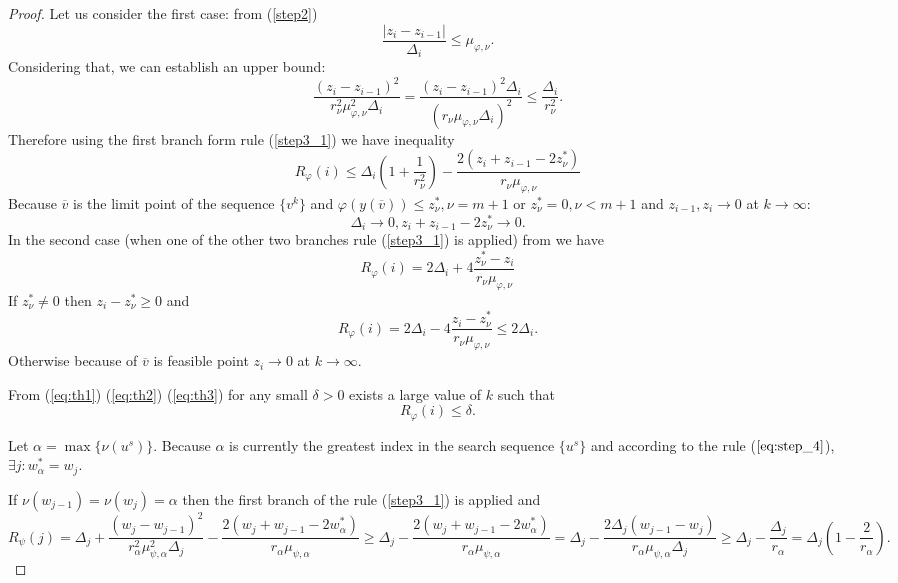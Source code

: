 \documentclass[runningheads]{llncs}
\begin{document}
\begin{proof}
  Let us consider the first case: from (\ref{step2})
  \begin{displaymath}
    \frac{|z_i-z_{i-1}|}{\Delta_i} \leqslant \mu_{\varphi,\nu}.
  \end{displaymath}
  Considering that, we can establish an upper bound:
  \begin{displaymath}
    \frac{(z_i-z_{i-1})^2}{r_\nu^2\mu_{\varphi,\nu}^2\Delta_i}=\frac{(z_i-z_{i-1})^2\Delta_i}{(r_\nu\mu_{\varphi,\nu}\Delta_i)^2}
    \leqslant \frac{\Delta_i}{r_\nu^2}.
  \end{displaymath}
  Therefore using the first branch form rule (\ref{step3_1}) we have inequality
  \begin{equation}
    \label{eq:th1}
    R_\varphi(i)\leqslant\Delta_i(1 + \frac{1}{r_\nu^2}) - \frac{2(z_i+z_{i-1}-2z^*_\nu)}{r_\nu\mu_{\varphi,\nu}}
  \end{equation}
  Because \(\overline{v}\) is the limit point of the sequence \(\{v^k\}\) and \(\varphi(y(\overline{v}))\leqslant z^*_{\nu}, \nu=m+1\) or
  \(z^*_\nu=0, \nu<m+1\) and \(z_{i-1},z_i\to 0\) at \(k\to\infty\):
  \begin{equation}
    \label{eq:th2}
    \Delta_i\to 0, z_i+z_{i-1} - 2 z_\nu^*\to 0.
  \end{equation}
  In the second case (when one of the other two branches rule (\ref{step3_1}) is applied) from we have
  \begin{displaymath}
    R_\varphi(i)=2\Delta_i + 4\frac{z^*_\nu-z_i}{r_\nu\mu_{\varphi,\nu}}
  \end{displaymath}
  If \(z^*_\nu \ne 0\) then \(z_i-z^*_\nu \geqslant 0\) and
  \begin{equation}
    \label{eq:th3}
    R_\varphi(i)=2\Delta_i - 4\frac{z_i-z^*_\nu}{r_\nu\mu_{\varphi,\nu}} \leqslant 2\Delta_i.
  \end{equation}
  Otherwise because of \(\overline{v}\) is feasible point \(z_i\to 0\) at \(k\to\infty\).

  From (\ref{eq:th1}) (\ref{eq:th2}) (\ref{eq:th3}) for any small \(\delta > 0\) exists a large value of \(k\) such that
  \begin{equation}
    R_\varphi(i)\leqslant \delta.
    \label{eq:th6}
  \end{equation}

  Let \(\alpha = \max\{\nu(u^s)\}\). Because \(\alpha\) is currently the greatest index
  in the search sequence \(\{u^s\}\) and according to the rule (\(\ref{eq:step_4}\)), \(\exists j: w^*_\alpha=w_j\).

  If \(\nu(w_{j-1})=\nu(w_{j})=\alpha\) then the first branch of the rule (\ref{step3_1}) is applied and
  \begin{dmath}
    R_\psi(j)=\Delta_j + \frac{(w_j-w_{j-1})^2}{r_\alpha^2\mu_{\psi,\alpha}^2\Delta_j}
      - \frac{2(w_j+w_{j-1}-2w^*_\alpha)}{r_\alpha\mu_{\psi,\alpha}} \geqslant
      \Delta_j - \frac{2(w_j+w_{j-1}-2w^*_\alpha)}{r_\alpha\mu_{\psi,\alpha}} =
      \Delta_j - \frac{2\Delta_j(w_{j-1}-w_j)}{r_\alpha\mu_{\psi,\alpha}\Delta_j} \geqslant
      \Delta_j - \frac{\Delta_j}{r_\alpha} = \Delta_j\left(1-\frac{2}{r_\alpha}\right).
    \label{eq:th4}
  \end{dmath}


\end{proof}
\end{document}
